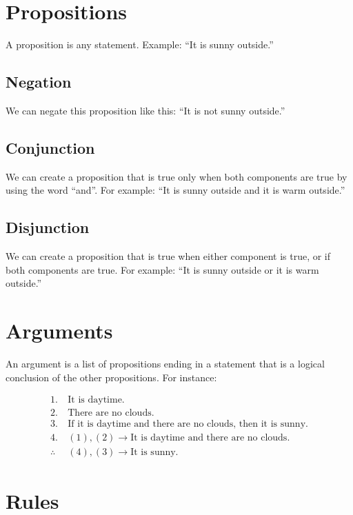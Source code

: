 \documentclass[a4paper,10pt]{report}
\begin{document}
\section{Propositions}

A proposition is any statement. Example: ``It is sunny outside.''

\subsection{Negation}

We can negate this proposition like this: ``It is not sunny outside.''

\subsection{Conjunction}

We can create a proposition that is true only when both components are true by
using the word ``and''. For example: ``It is sunny outside and it is warm
outside.''

\subsection{Disjunction}

We can create a proposition that is true when either component is true, or if
both components are true. For example: ``It is sunny outside or it is warm
outside.''

\section{Arguments}

An argument is a list of propositions ending in a statement that is a logical
conclusion of the other propositions. For instance:

\begin{align*}
 1.~&\text{It is daytime.} \\
 2.~&\text{There are no clouds.} \\
 3.~&\text{If it is daytime and there are no clouds, then it is sunny.} \\
 \hline
 4.~&(1), (2) \to \text{It is daytime and there are no clouds.} \\
 \hline
 \therefore~&(4), (3) \to \text{It is sunny.}
\end{align*}

\section{Rules}
\end{document}
